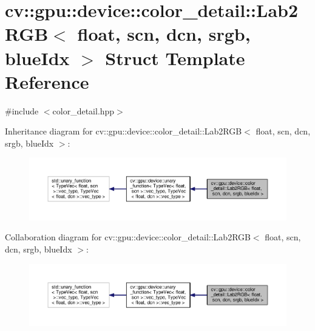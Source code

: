 \hypertarget{structcv_1_1gpu_1_1device_1_1color__detail_1_1Lab2RGB_3_01float_00_01scn_00_01dcn_00_01srgb_00_01blueIdx_01_4}{\section{cv\-:\-:gpu\-:\-:device\-:\-:color\-\_\-detail\-:\-:Lab2\-R\-G\-B$<$ float, scn, dcn, srgb, blue\-Idx $>$ Struct Template Reference}
\label{structcv_1_1gpu_1_1device_1_1color__detail_1_1Lab2RGB_3_01float_00_01scn_00_01dcn_00_01srgb_00_01blueIdx_01_4}
}


{\ttfamily \#include $<$color\-\_\-detail.\-hpp$>$}



Inheritance diagram for cv\-:\-:gpu\-:\-:device\-:\-:color\-\_\-detail\-:\-:Lab2\-R\-G\-B$<$ float, scn, dcn, srgb, blue\-Idx $>$\-:\nopagebreak
\begin{figure}[H]
\begin{center}
\leavevmode
\includegraphics[width=350pt]{structcv_1_1gpu_1_1device_1_1color__detail_1_1Lab2RGB_3_01float_00_01scn_00_01dcn_00_01srgb_00_01blueIdx_01_4__inherit__graph}
\end{center}
\end{figure}


Collaboration diagram for cv\-:\-:gpu\-:\-:device\-:\-:color\-\_\-detail\-:\-:Lab2\-R\-G\-B$<$ float, scn, dcn, srgb, blue\-Idx $>$\-:\nopagebreak
\begin{figure}[H]
\begin{center}
\leavevmode
\includegraphics[width=350pt]{structcv_1_1gpu_1_1device_1_1color__detail_1_1Lab2RGB_3_01float_00_01scn_00_01dcn_00_01srgb_00_01blueIdx_01_4__coll__graph}
\end{center}
\end{figure}
